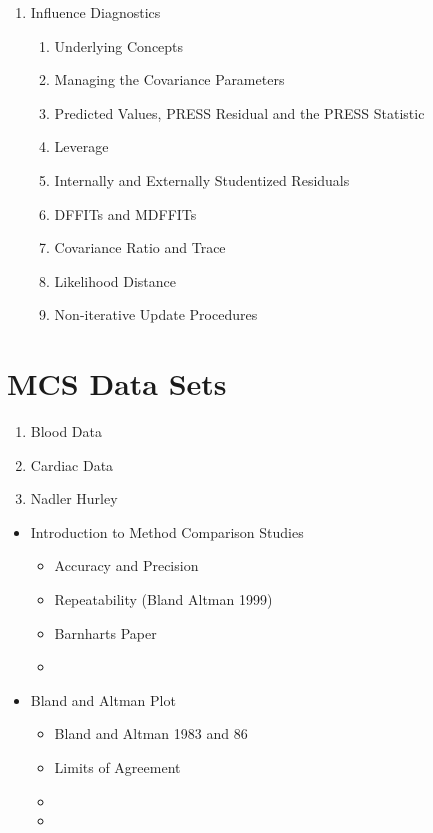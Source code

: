 \documentclass[12pt, a4paper]{report}
\begin{document}
\begin{enumerate}
	\item Influence Diagnostics
	\begin{enumerate}
		\item Underlying Concepts
		\item Managing the Covariance Parameters
		\item Predicted Values, PRESS Residual and the PRESS Statistic
		\item Leverage
		\item Internally and Externally Studentized Residuals
		\item DFFITs and MDFFITs
		\item Covariance Ratio and Trace
		\item Likelihood Distance
		\item Non-iterative Update Procedures
	\end{enumerate}
\end{enumerate}
\newpage
\section{MCS Data Sets}
\begin{enumerate}
	\item Blood Data
	\item Cardiac Data
	\item Nadler Hurley 
\end{enumerate}

\begin{itemize}		
	
	\item	Introduction to Method Comparison Studies	
	\begin{itemize}	
		\item	Accuracy and Precision
		\item	Repeatability (Bland Altman 1999)
		\item	Barnharts Paper
		\item	
	\end{itemize}	
	
	
	\item	Bland and Altman Plot	
	\begin{itemize}	
		\item	Bland and Altman 1983 and 86
		\item	Limits of Agreement
		\item	
		\item	
	\end{itemize}

	
\end{itemize}		
\end{document}
